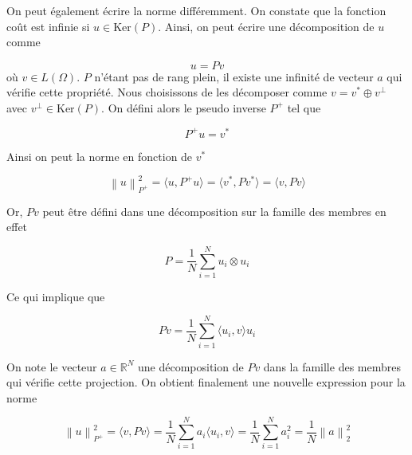 \documentclass{article}
\newcommand{\norm}[1]{\left\lVert #1 \right\rVert}
\begin{document}

On peut également écrire la norme différemment. On constate que la fonction coût est infinie si $u \in \text{Ker} (P)$. Ainsi, on peut écrire une décomposition de $u$ comme

\begin{equation*}
    u = P v
\end{equation*} où $v \in L(\Omega)$. $P$ n'étant pas de rang plein, il existe une infinité de vecteur $a$ qui vérifie cette propriété. Nous choisissons de les décomposer comme $v = v^* \oplus v^\perp$ avec $v^\perp \in \text{Ker}(P)$. On défini alors le pseudo inverse $P^+$ tel que

\begin{equation*}
    P^+ u = v^*
\end{equation*}

Ainsi on peut la norme en fonction de $v^*$

\begin{equation*}
    \norm{u}^2_{P^+} = \langle u, P^+ u \rangle = \langle v^*, P v^* \rangle = \langle v, P v \rangle
\end{equation*}

Or, $P v$ peut être défini dans une décomposition sur la famille des membres en effet

\begin{equation*}
    P = \frac1N \sum_{i=1}^N u_i \otimes u_i
\end{equation*}

Ce qui implique que

\begin{equation*}
    P v = \frac1N \sum_{i=1}^N \langle u_i, v \rangle u_i
\end{equation*}

On note le vecteur $a \in \mathbb{R}^N$ une décomposition de $Pv$ dans la famille des membres qui vérifie cette projection. On obtient finalement une nouvelle expression pour la norme

\begin{equation}
    \norm{u}^2_{P^+} = \langle v, P v \rangle = \frac1N \sum_{i=1}^N a_i \langle u_i, v\rangle = \frac1N \sum_{i=1}^N a_i^2 = \frac1N \norm{a}^2_2
\end{equation}
\end{document}
